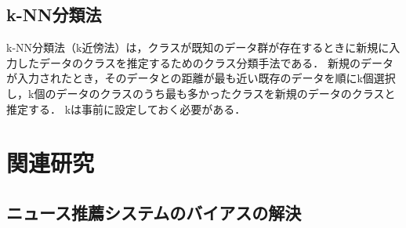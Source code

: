 \documentclass[12pt,a4j]{jreport}
\begin{document}





\section{k-NN分類法}
k-NN分類法（k近傍法）は，クラスが既知のデータ群が存在するときに新規に入力したデータのクラスを推定するためのクラス分類手法である\cite{aurellen20}．
新規のデータが入力されたとき，そのデータとの距離が最も近い既存のデータを順にk個選択し，k個のデータのクラスのうち最も多かったクラスを新規のデータのクラスと推定する．
kは事前に設定しておく必要がある．


\chapter{関連研究}


\section{ニュース推薦システムのバイアスの解決}
~
\end{document}
